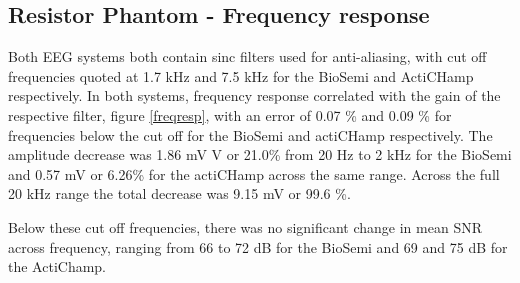 \subsection{Resistor Phantom - Frequency response}
Both EEG systems both contain sinc filters used for anti-aliasing, with cut off frequencies quoted at 1.7 kHz and 7.5 kHz for the BioSemi and ActiCHamp respectively. In both systems, frequency response correlated with the gain of the respective filter, figure \ref{freqresp}, with an error of 0.07 \% and 0.09 \% for frequencies below the cut off for the BioSemi and actiCHamp respectively. The amplitude decrease was 1.86 mV V or 21.0\% from 20 Hz to 2 kHz for the BioSemi and 0.57 mV or 6.26\% for the actiCHamp across the same range. Across the full 20 kHz range the total decrease was 9.15 mV or  99.6 \%. 



Below these cut off frequencies, there was no significant change in mean SNR across frequency, ranging from 66 to 72 dB for the BioSemi and 69 and 75 dB for the ActiChamp.  